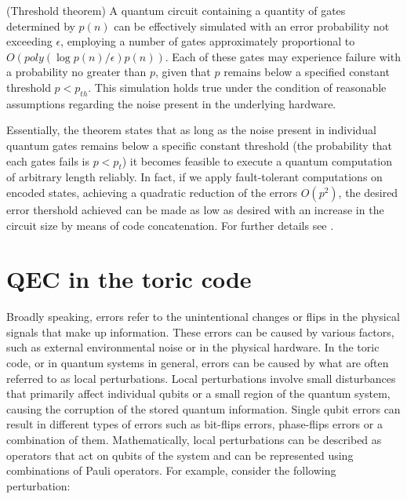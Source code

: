 \documentclass{Configuration_Files/PoliMi3i_thesis}
\begin{document}
\begin{theorem}(Threshold theorem)
	A quantum circuit containing a quantity of gates determined by $p(n)$ can be effectively simulated with an error probability not exceeding $\epsilon$, employing a number of gates approximately proportional to $O(poly(\log p(n)/\epsilon)p(n))$. Each of these gates may experience failure with a probability no greater than $p$, given that $p$ remains below a specified constant threshold $p < p_{th}$. This simulation holds true under the condition of reasonable assumptions regarding the noise present in the underlying hardware.
\end{theorem}

Essentially, the theorem states that as long as the noise present in individual quantum gates remains below a specific constant threshold (the probability that each gates fails is $p<p_t$) it becomes feasible to execute a quantum computation of arbitrary length reliably. In fact, if we apply fault-tolerant computations on encoded states, achieving a quadratic reduction of the errors $O(p^2)$, the desired error thershold achieved can be made as low as desired with an increase in the circuit size by means of code concatenation. For further details see \cite{Nie06}.\newline














\newpage
\section{QEC in the toric code}
\label{sec:TC}

Broadly speaking, errors refer to the unintentional changes or flips in the physical signals that make up information. These errors can be caused by various factors, such as external environmental noise or in the physical hardware. 
In the toric code, or in quantum systems in general, errors can be caused by what are often referred to as local perturbations. Local perturbations involve small disturbances that primarily affect individual qubits or a small region of the quantum system, causing the corruption of the stored quantum information. Single qubit errors can result in different types of errors such as bit-flips errors, phase-flips errors or a combination of them. \newline
Mathematically, local perturbations can be described as operators that act on qubits of the system and can be represented using combinations of Pauli operators. For example, consider the following perturbation:
\end{document}
